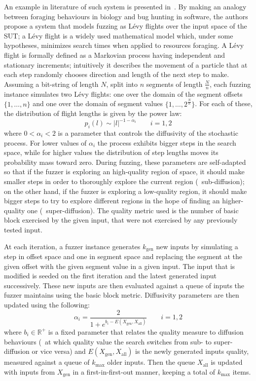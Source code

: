 An example in literature of such system is presented
in~\cite{bottinger2016fuzzing}. By making an analogy between foraging behaviours
in biology and bug hunting in software, the authors propose a system that models
fuzzing as L\'evy flights over the input space of the \ac{SUT}; a L\'evy flight
is a widely used mathematical model which, under some hypotheses, minimizes
search times when applied to resources foraging. A L\'evy flight is formally
defined as a Markovian process having independent and stationary increments;
intuitively it describes the movement of a particle that at each step randomly
chooses direction and length of the next step to make. Assuming a bit-string of
length $N$, split into $n$ segments of length $\frac{N}{n}$, each fuzzing
instance simulates two L\'evy flights: one over the domain of the segment
offsets $\{1,\dots,n\}$ and one over the domain of segment values
$\{1,\dots,2^{\frac{N}{n}}\}$. For each of these, the distribution of flight
lengths is given by the power law:
$$p_i(l) \sim |l|^{-1 - \alpha_i} \qquad i = 1,2$$
where $0 < \alpha_i < 2$ is a parameter that controls the diffusivity of the
stochastic process. For lower values of $\alpha_i$ the process exhibits bigger
steps in the search space, while for higher values the distribution of step
lengths moves its probability mass toward zero. During fuzzing, these parameters
are self-adapted so that if the fuzzer is exploring an high-quality region of
space, it should make smaller steps in order to thoroughly explore the current
region (\ie~sub-diffusion); on the other hand, if the fuzzer is exploring a
low-quality region, it should make bigger steps to try to explore different
regions in the hope of finding an higher-quality one (\ie~super-diffusion). The
quality metric used is the number of basic block exercised by the given input,
that were not exercised by any previously tested input.

At each iteration, a fuzzer instance generates $k_\text{gen}$ new inputs by
simulating a step in offset space and one in segment space and replacing the
segment at the given offset with the given segment value in a given input. The
input that is modified is seeded on the first iteration and the latest generated
input successively. These new inputs are then evaluated against a queue of
inputs the fuzzer maintains using the basic block metric. Diffusivity parameters
are then updated using the following:
$$\alpha_i = \frac{2}{1 + e^{b_i - E(X_\text{gen}, X_\text{all})}}
\qquad i = 1,2$$
where $b_i \in \mathbb{R}^+$ is a fixed parameter that relates the quality
measure to diffusion behaviours (\ie~at which quality value the search switches
from sub- to super-diffusion or vice versa) and $E(X_\text{gen}, X_\text{all})$
is the newly generated inputs quality, measured against a queue of
$k_\text{max}$ older inputs. Then the queue $X_\text{all}$ is updated with
inputs from $X_\text{gen}$ in a first-in-first-out manner, keeping a total of
$k_\text{max}$ items.


